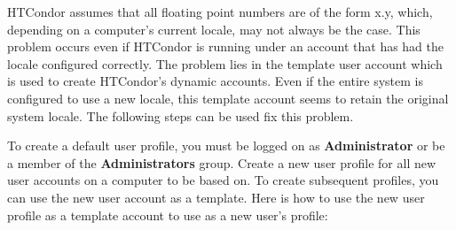 HTCondor assumes that all floating point numbers are of the form x.y, which,
depending on a computer's current locale, may not always be the case. This
problem occurs even if HTCondor is running under an account that has had the
locale configured correctly.  The problem lies in the template user account
which is used to create HTCondor's dynamic accounts. Even if the entire
system is configured to use a new locale, this template account seems to
retain the original system locale. The following steps can be used fix
this problem.

To create a default user profile, you must be logged on as 
\textbf{Administrator} or be a member of the \textbf{Administrators} group.
Create a new user profile for all new user accounts on a computer to be
based on. To create subsequent profiles, you can use the new user account
as a template. Here is how to use the new user profile as a template account
to use as a new user's profile:
